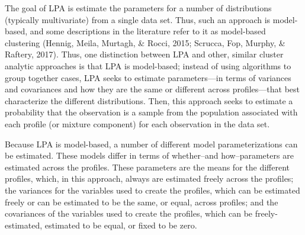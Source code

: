 \documentclass[english,man]{apa6}
\begin{document}
The goal of LPA is estimate the parameters for a number of distributions
(typically multivariate) from a single data set. Thus, such an approach is
model-based, and some descriptions in the literature refer to it as model-based
clustering (Hennig, Meila, Murtagh, \& Rocci, 2015; Scrucca, Fop, Murphy, \&
Raftery, 2017). Thus, one distinction between LPA and other, similar cluster
analytic approaches is that LPA is model-based; instead of using algorithms to
group together cases, LPA seeks to estimate parameters---in terms of variances
and covariances and how they are the same or different across profiles---that
best characterize the different distributions. Then, this approach seeks to
estimate a probability that the observation is a sample from the population
associated with each profile (or mixture component) for each observation in the
data set.

Because LPA is model-based, a number of different model parameterizations can be
estimated. These models differ in terms of whether--and how--parameters are
estimated across the profiles. These parameters are the means for the different
profiles, which, in this approach, always are estimated freely across the
profiles; the variances for the variables used to create the profiles, which can
be estimated freely or can be estimated to be the same, or equal, across
profiles; and the covariances of the variables used to create the profiles,
which can be freely-estimated, estimated to be equal, or fixed to be zero.
\end{document}
